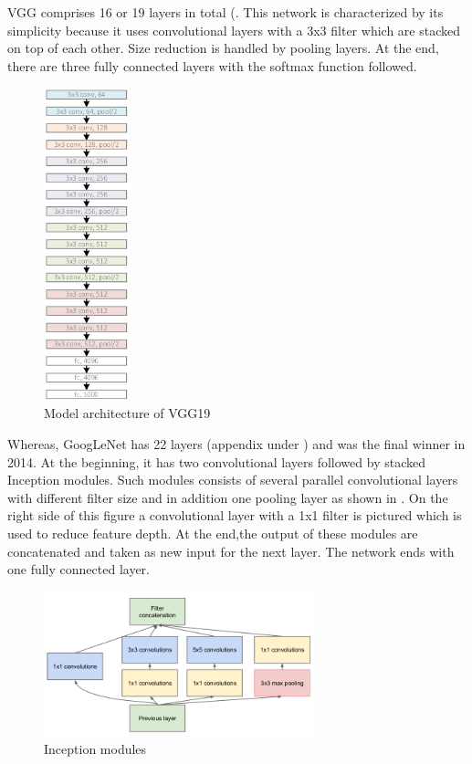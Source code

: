 VGG comprises 16 or 19 layers in total (. This network is characterized by its simplicity because it uses convolutional layers with a 3x3 filter which are stacked on top of each other. Size reduction is handled by pooling layers. At the end, there are three fully connected layers with the softmax function followed.

\begin{figure}[htbp]
\centering
\includegraphics[width=2.5cm]{includes/VGG19}
\caption[Model architecture of VGG19]{Model architecture of VGG19 \citep[p. 8]{He2016}}
\label{fig:VGG19}
\end{figure}

Whereas, GoogLeNet has 22 layers (appendix under ) and was the final winner in 2014. At the beginning, it has two convolutional layers followed by stacked Inception modules. Such modules consists of several parallel convolutional layers with different filter size and in addition one pooling layer as shown in . On the right side of this figure a convolutional layer with a 1x1 filter is pictured which is used to reduce feature depth. At the end,the output of these modules are concatenated and taken as new input for the next layer. The network ends with one fully connected layer.\\

\begin{figure}[htbp]
\centering
\includegraphics[width=0.7\textwidth]{includes/GoogLeNetModules}
\caption[Inception modules]{Inception modules \citep[p. 5]{Szegedy2014}}
\label{fig:FH-Logo5}
\end{figure}

